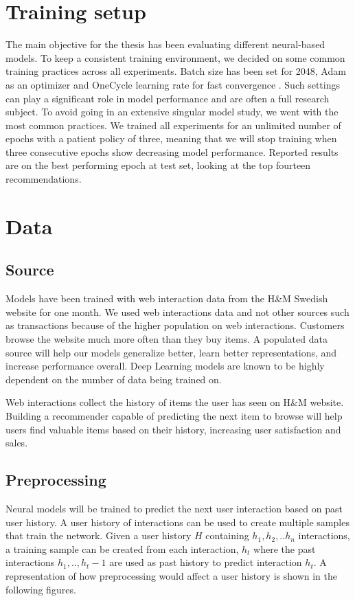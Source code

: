 \documentclass{kththesis}
\begin{document}
\section{Training setup}
The main objective for the thesis has been evaluating different neural-based models. To keep a consistent training environment, we decided on some common training practices across all experiments. Batch size has been set for 2048, Adam \cite{adam} as an optimizer and OneCycle learning rate for fast convergence \cite{onecycle}. Such settings can play a significant role in model performance and are often a full research subject. To avoid going in an extensive singular model study, we went with the most common practices. We trained all experiments for an unlimited number of epochs with a patient policy of three, meaning that we will stop training when three consecutive epochs show decreasing model performance. Reported results are on the best performing epoch at test set, looking at the top fourteen recommendations.

\section{Data}
\subsection{Source}
Models have been trained with web interaction data from the H\&M Swedish website for one month. We used web interactions data and not other sources such as transactions because of the higher population on web interactions. Customers browse the website much more often than they buy items. A populated data source will help our models generalize better, learn better representations, and increase performance overall. Deep Learning models are known to be highly dependent on the number of data being trained on.

Web interactions collect the history of items the user has seen on H\&M website. Building a recommender capable of predicting the next item to browse will help users find valuable items based on their history, increasing user satisfaction and sales.

\subsection{Preprocessing}
Neural models will be trained to predict the next user interaction based on past user history. A user history of interactions can be used to create multiple samples that train the network. Given a user history $H$ containing $h_1, h_2, .. h_n$ interactions, a training sample can be created from each interaction, $h_t$ where the past interactions $h_1, .., h_t-1$ are used as past history to predict interaction $h_t$. A representation of how preprocessing would affect a user history is shown in the following figures.
\end{document}
